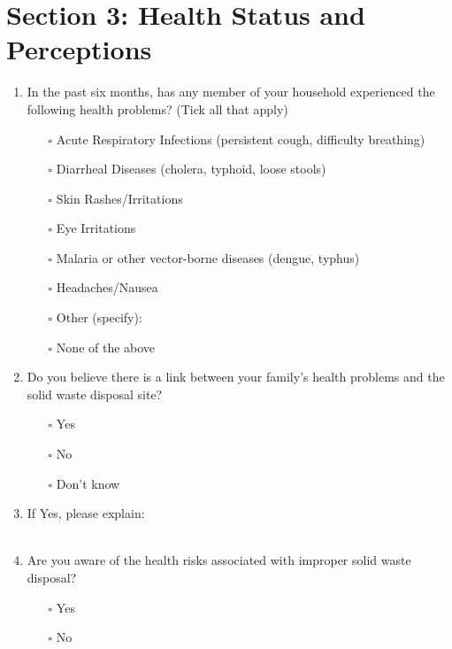 \section*{Section 3: Health Status and Perceptions}

\begin{enumerate}[label=\arabic*., start=13]
    \item In the past six months, has any member of your household experienced the following health problems? (Tick all that apply)
    \begin{itemize}
        \item[$\square$] Acute Respiratory Infections (persistent cough, difficulty breathing)
        \item[$\square$] Diarrheal Diseases (cholera, typhoid, loose stools)
        \item[$\square$] Skin Rashes/Irritations
        \item[$\square$] Eye Irritations
        \item[$\square$] Malaria or other vector-borne diseases (dengue, typhus)
        \item[$\square$] Headaches/Nausea
        \item[$\square$] Other (specify): \hrulefill
        \item[$\square$] None of the above
    \end{itemize}

    \item Do you believe there is a link between your family’s health problems and the solid waste disposal site?
    \begin{itemize}
        \item[$\square$] Yes
        \item[$\square$] No
        \item[$\square$] Don’t know
    \end{itemize}

    \item If Yes, please explain: \\
    \vspace{1em}\hrulefill \\[1em]
    \hrulefill

    \item Are you aware of the health risks associated with improper solid waste disposal?
    \begin{itemize}
        \item[$\square$] Yes \quad \item[$\square$] No
    \end{itemize}


\end{enumerate}
